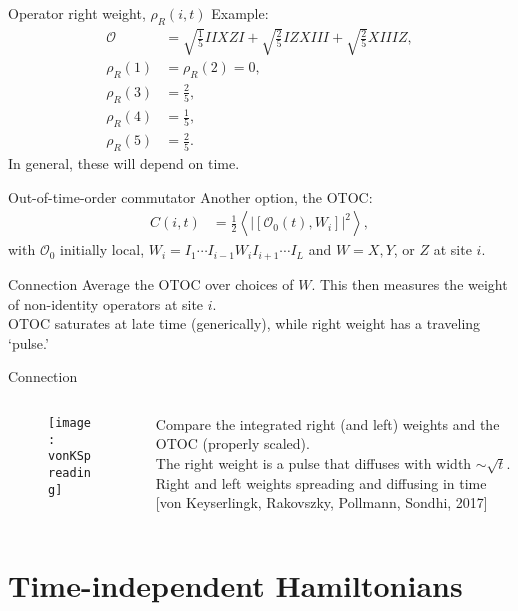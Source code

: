 \documentclass{beamer}
\newcommand{\half}{\frac{1}{2}}
\renewcommand{\th}[1]{\frac{1}{#1}}
\newcommand{\ex}[1]{\left\langle #1 \right\rangle}
\newcommand{\nn}{\nonumber\\}
\begin{document}
\begin{frame}{Operator right weight, $\rho_R(i,t)$}
Example:
\begin{align}
\mathcal{O} &= \sqrt{\th{5}} IIXZI + \sqrt{\frac{2}{5}} IZXIII + \sqrt{\frac{2}{5}} XIIIZ,\nn
\rho_R(1) &= \rho_R(2) = 0,\nn
\rho_R(3) &= \frac{2}{5},\nn
\rho_R(4) &= \frac{1}{5},\nn
\rho_R(5) &= \frac{2}{5}.\nonumber
\end{align}
In general, these will depend on time.
\end{frame}

\begin{frame}{Out-of-time-order commutator}
Another option, the OTOC:
\begin{align*}
C(i,t) &= \half\ex{|[\mathcal{O}_0(t), W_i]|^2},
\end{align*}
with $\mathcal{O}_0$ initially local, $W_i=I_1\cdots I_{i-1}W_iI_{i+1}\cdots I_L$ and $W=X,Y$, or $Z$ at site $i$.
\end{frame}

\begin{frame}{Connection}
Average the OTOC over choices of $W$. This then measures the weight of non-identity operators at site $i$.\\
OTOC saturates at late time (generically), while right weight has a traveling `pulse.'
\end{frame}

\begin{frame}{Connection}
\begin{columns}
	\begin{column}{0.5\textwidth}  %
		\begin{figure}
			\centering
			\texttt{[image: vonKSpreading]}
		\end{figure}
	\end{column}
	\begin{column}{0.5\textwidth}
		Compare the integrated right (and left) weights and the OTOC (properly scaled).\\
		\bigskip
		The right weight is a pulse that diffuses with width $\sim \sqrt{t}$.\\
		\bigskip
		\bigskip
		Right and left weights spreading and diffusing in time [von Keyserlingk, Rakovszky, Pollmann, Sondhi, 2017]
		\bigskip
	\end{column}
\end{columns}
\end{frame}

\section{Time-independent Hamiltonians}
\end{document}
